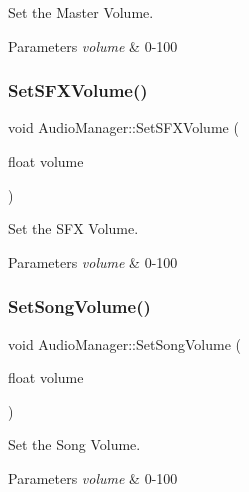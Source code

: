 Set the Master Volume. 


\begin{DoxyParams}{Parameters}
{\em volume} & 0-\/100 \\
\hline
\end{DoxyParams}
\mbox{\label{classAudioManager_a6f9e78a71e1046bf4f13baad2adff4c3}} 
\subsubsection{\texorpdfstring{Set\+S\+F\+X\+Volume()}{SetSFXVolume()}}
{\footnotesize\ttfamily void Audio\+Manager\+::\+Set\+S\+F\+X\+Volume (\begin{DoxyParamCaption}\item[{float}]{volume }\end{DoxyParamCaption})}



Set the S\+FX Volume. 


\begin{DoxyParams}{Parameters}
{\em volume} & 0-\/100 \\
\hline
\end{DoxyParams}
\mbox{\label{classAudioManager_acc31d4056bfdcfff325a91bcd583b8a0}} 
\subsubsection{\texorpdfstring{Set\+Song\+Volume()}{SetSongVolume()}}
{\footnotesize\ttfamily void Audio\+Manager\+::\+Set\+Song\+Volume (\begin{DoxyParamCaption}\item[{float}]{volume }\end{DoxyParamCaption})}



Set the Song Volume. 


\begin{DoxyParams}{Parameters}
{\em volume} & 0-\/100 \\
\hline
\end{DoxyParams}
\mbox{\label{classAudioManager_a0c203bcb774ef51b949a7e20f598630a}} 
